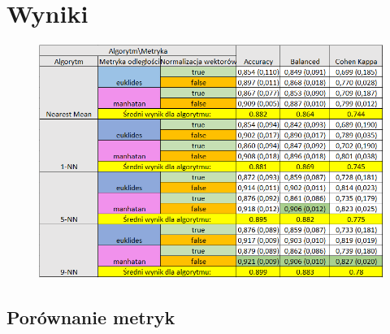 \documentclass[12pt]{article}
\begin{document}
\section{Wyniki}
\newpage 
\begin{figure}[H]
	\centering
		\includegraphics[scale=0.75]{images/ogolna_tabela.png}
\end{figure}


\subsection{Porównanie metryk}
\end{document}
